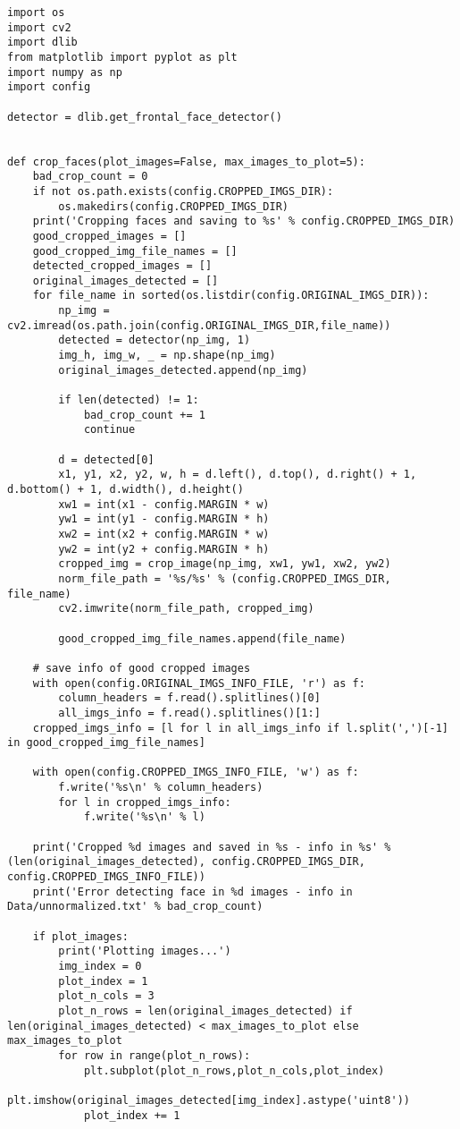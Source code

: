 \begin{verbatim}
import os
import cv2
import dlib
from matplotlib import pyplot as plt
import numpy as np
import config

detector = dlib.get_frontal_face_detector()


def crop_faces(plot_images=False, max_images_to_plot=5):
    bad_crop_count = 0
    if not os.path.exists(config.CROPPED_IMGS_DIR):
        os.makedirs(config.CROPPED_IMGS_DIR)
    print('Cropping faces and saving to %s' % config.CROPPED_IMGS_DIR)
    good_cropped_images = []
    good_cropped_img_file_names = []
    detected_cropped_images = []
    original_images_detected = []
    for file_name in sorted(os.listdir(config.ORIGINAL_IMGS_DIR)):
        np_img = cv2.imread(os.path.join(config.ORIGINAL_IMGS_DIR,file_name))
        detected = detector(np_img, 1)
        img_h, img_w, _ = np.shape(np_img)
        original_images_detected.append(np_img)

        if len(detected) != 1:
            bad_crop_count += 1
            continue

        d = detected[0]
        x1, y1, x2, y2, w, h = d.left(), d.top(), d.right() + 1, d.bottom() + 1, d.width(), d.height()
        xw1 = int(x1 - config.MARGIN * w)
        yw1 = int(y1 - config.MARGIN * h)
        xw2 = int(x2 + config.MARGIN * w)
        yw2 = int(y2 + config.MARGIN * h)
        cropped_img = crop_image(np_img, xw1, yw1, xw2, yw2)
        norm_file_path = '%s/%s' % (config.CROPPED_IMGS_DIR, file_name)
        cv2.imwrite(norm_file_path, cropped_img)

        good_cropped_img_file_names.append(file_name)

    # save info of good cropped images
    with open(config.ORIGINAL_IMGS_INFO_FILE, 'r') as f:
        column_headers = f.read().splitlines()[0]
        all_imgs_info = f.read().splitlines()[1:]
    cropped_imgs_info = [l for l in all_imgs_info if l.split(',')[-1] in good_cropped_img_file_names]

    with open(config.CROPPED_IMGS_INFO_FILE, 'w') as f:
        f.write('%s\n' % column_headers)
        for l in cropped_imgs_info:
            f.write('%s\n' % l)

    print('Cropped %d images and saved in %s - info in %s' % (len(original_images_detected), config.CROPPED_IMGS_DIR, config.CROPPED_IMGS_INFO_FILE))
    print('Error detecting face in %d images - info in Data/unnormalized.txt' % bad_crop_count)

    if plot_images:
        print('Plotting images...')
        img_index = 0
        plot_index = 1
        plot_n_cols = 3
        plot_n_rows = len(original_images_detected) if len(original_images_detected) < max_images_to_plot else max_images_to_plot
        for row in range(plot_n_rows):
            plt.subplot(plot_n_rows,plot_n_cols,plot_index)
            plt.imshow(original_images_detected[img_index].astype('uint8'))
            plot_index += 1


\end{verbatim}
